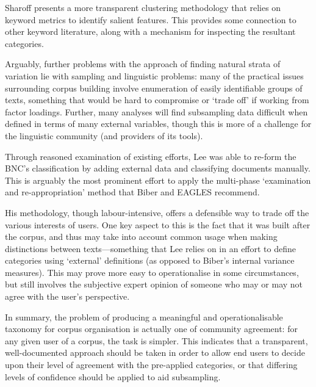 Sharoff\cite{sharoff2007classifying} presents a more transparent clustering methodology that relies on keyword metrics to identify salient features.  This provides some connection to other keyword literature, along with a mechanism for inspecting the resultant categories.

Arguably, further problems with the approach of finding natural strata of variation lie with sampling and linguistic problems: many of the practical issues surrounding corpus building involve enumeration of easily identifiable groups of texts, something that would be hard to compromise or `trade off' if working from factor loadings.  Further, many analyses will find subsampling data difficult when defined in terms of many external variables\cite{aston2001text}, though this is more of a challenge for the linguistic community (and providers of its tools).


Through reasoned examination of existing efforts, Lee\cite{lee2003bnc}
was able to re-form the BNC's classification by adding external data and classifying documents manually.  This is arguably the most prominent effort to apply the multi-phase `examination and re-appropriation' method that Biber and EAGLES recommend.

His methodology, though labour-intensive, offers a defensible way to trade off the various interests of users.  One key aspect to this is the fact that it was built after the corpus, and thus may take into account common usage when making distinctions between texts---something that Lee relies on in an effort to define categories using `external' definitions (as opposed to Biber's internal variance measures).  This may prove more easy to operationalise in some circumstances, but still involves the subjective expert opinion of someone who may or may not agree with the user's perspective\cite{aston2001text}.



In summary, the problem of producing a meaningful and operationalisable taxonomy for corpus organisation is actually one of community agreement: for any given user of a corpus, the task is simpler.  This indicates that a transparent, well-documented approach should be taken in order to allow end users to decide upon their level of agreement with the pre-applied categories, or that differing levels of confidence should be applied to aid subsampling.


